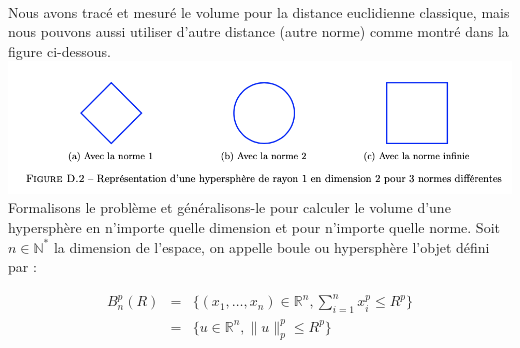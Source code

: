 \\
Nous avons tracé et mesuré le volume pour la distance euclidienne classique, mais nous pouvons aussi utiliser d’autre distance (autre norme) comme montré dans la figure ci-dessous.
\\
\includegraphics[width=\linewidth]{./img/notions_math/hypersphere_2}
\\
Formalisons le problème et généralisons-le pour calculer le volume d’une hypersphère en n’importe quelle dimension et pour n’importe quelle norme. Soit $n \in \mathbb{N}^*$ la dimension de l’espace, on appelle boule ou hypersphère l’objet défini par :

\begin{eqnarray*} 
    B_n^p(R) &=& \{ (x_1, \ldots, x_n) \in \mathbb{R}^n, \sum_{i=1}^n x_i^p \leqslant R^p\} \\
    &=& \{ u \in \mathbb{R}^n, \|u\|_p^p \leqslant R^p\}
\end{eqnarray*}

